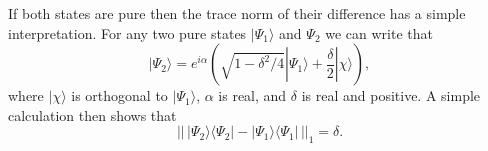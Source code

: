 \documentclass[12pt]{article}
\newcommand{\be}{\begin{equation}}
\newcommand{\ee}{\end{equation}}
\newcommand{\lan}{\langle}
\newcommand{\ran}{\rangle}
\begin{document}
If both states are pure then the trace norm of their difference has a simple interpretation.  For any two pure states $|\Psi_1\ran$ and $\Psi_2$ we can write that
\be
|\Psi_2\ran=e^{i\alpha}\left(\sqrt{1-\delta^2/4}|\Psi_1\ran+\frac{\delta}{2} |\chi\ran\right),
\ee
where $|\chi\ran$ is orthogonal to $|\Psi_1\ran$, $\alpha$ is real, and $\delta$ is real and positive.  A simple calculation then shows that
\be\label{puretrnorm}
||\,|\Psi_2\ran\lan\Psi_2|-|\Psi_1\ran\lan\Psi_1|\,||_1=\delta.
\ee

\end{document}
